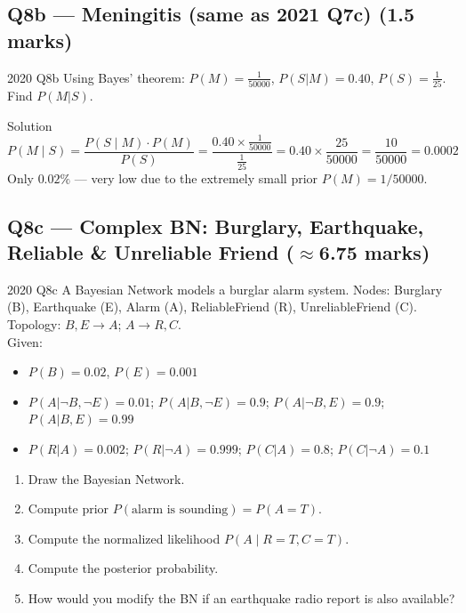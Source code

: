 \documentclass[12pt,a4paper]{article}
\begin{document}
\subsection{Q8b --- Meningitis (same as 2021 Q7c) (1.5 marks)}

\begin{qbox}{2020 Q8b}
Using Bayes' theorem: $P(M)=\frac{1}{50000}$, $P(S|M)=0.40$, $P(S)=\frac{1}{25}$. Find $P(M|S)$.
\end{qbox}

\begin{solbox}{Solution}
\[
P(M \mid S) = \frac{P(S \mid M)\cdot P(M)}{P(S)} = \frac{0.40 \times \frac{1}{50000}}{\frac{1}{25}} = 0.40 \times \frac{25}{50000} = \frac{10}{50000} = \boxed{0.0002}
\]
Only $0.02\%$ --- very low due to the extremely small prior $P(M) = 1/50000$.
\end{solbox}

\subsection{Q8c --- Complex BN: Burglary, Earthquake, Reliable \& Unreliable Friend ($\approx$6.75 marks)}

\begin{qbox}{2020 Q8c}
A Bayesian Network models a burglar alarm system. Nodes: Burglary (B), Earthquake (E), Alarm (A), ReliableFriend (R), UnreliableFriend (C).\\[4pt]
Topology: $B, E \to A$; $A \to R, C$.\\[4pt]
Given:
\begin{itemize}[noitemsep]
  \item $P(B)=0.02$, $P(E)=0.001$
  \item $P(A|\neg B,\neg E)=0.01$; $P(A|B,\neg E)=0.9$; $P(A|\neg B,E)=0.9$; $P(A|B,E)=0.99$
  \item $P(R|A)=0.002$; $P(R|\neg A)=0.999$; \quad $P(C|A)=0.8$; $P(C|\neg A)=0.1$
\end{itemize}
\begin{enumerate}[label=(\roman*)]
  \item Draw the Bayesian Network.
  \item Compute prior $P(\text{alarm is sounding}) = P(A=T)$.
  \item Compute the normalized likelihood $P(A \mid R=T, C=T)$.
  \item Compute the posterior probability.
  \item How would you modify the BN if an earthquake radio report is also available?
\end{enumerate}
\end{qbox}
\end{document}
